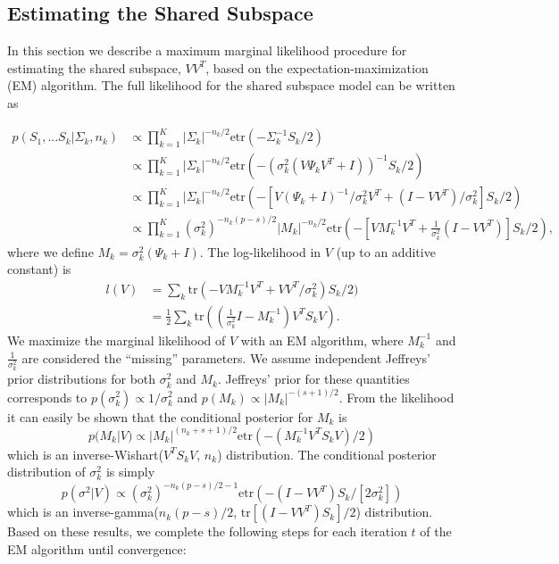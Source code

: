 \documentclass[12pt]{article}
\newcommand{\tr}{\text{tr}}
\newcommand{\etr}{\text{etr}}
\begin{document}

\subsection{Estimating the  Shared Subspace}
\label{sec:em}

In this section we describe a maximum marginal likelihood procedure for
estimating the shared subspace, $VV^T$, based on the
expectation-maximization (EM) algorithm.  The full likelihood
for the shared subspace model can be written as

\begin{align}
\nonumber p(S_1, ... S_k | \Sigma_k,n_k) &\propto \prod_{k=1}^K |\Sigma_k|^{-n_k/2}\etr(-\Sigma_k^{-1}S_k/2)  \\
\nonumber &\propto \prod_{k=1}^K  |\Sigma_k|^{-n_k/2}\etr(-(\sigma_k^2(V\Psi_kV^T +
  I))^{-1}S_k/2) \\
\nonumber &\propto \prod_{k=1}^K  |\Sigma_k|^{-n_k/2}\etr(-\left[V(\Psi_k +
  I)^{-1}/\sigma_k^2 V^T + (I-VV^T)/\sigma^2_k\right]S_k/2)
  \\
&\propto \prod_{k=1}^K  (\sigma_k^2)^{-n_k(p-s)/2}|M_k|^{-n_k/2}\etr(-\left[VM_k^{-1}V^T + \frac{1}{\sigma^2_k} (I-VV^T)\right]S_k/2) ,
\end{align}
%
\noindent where we define $M_k = \sigma_k^2(\Psi_k + I)$.  The log-likelihood in
$V$ (up to an additive constant) is
%
\begin{align}
\nonumber l(V) &= \sum_k \tr\left(-VM_k^{-1}V^T +
       VV^T/\sigma^2_k\right)S_k/2)\\
&=\frac{1}{2}\sum_k \tr\left((\frac{1}{\sigma_k^2}I-M_k^{-1})V^T
  S_kV\right).
\label{eqn:likV}
\end{align}
%
We maximize the marginal likelihood of $V$ with an EM algorithm, where
$M_k^{-1}$ and $\frac{1}{\sigma_k^2}$ are considered the
``missing'' parameters.  We assume independent Jeffreys'
prior distributions for both $\sigma_k^2$ and $M_k$.  Jeffreys' prior
for these quantities corresponds to
$p(\sigma_k^2) \propto 1/\sigma_k^2$ and
$p(M_k) \propto |M_k|^{-(s+1)/2}$.  From the likelihood it can easily
be shown that the conditional posterior for $M_k$ is
%
$$p(M_k | V) \propto |M_k|^{(n_k + s + 1)/2}\etr(-(M_k^{-1}V^TS_kV)/2) $$
%
\noindent which is an inverse-Wishart($V^TS_kV$, $n_k$) distribution.  The
conditional posterior distribution of $\sigma_k^2$ is simply
%
$$p\left(\sigma^2 | V\right) \propto (\sigma_k^2)^{-n_k(p-s)/2-1}\etr\left(- (I-VV^T)S_k/[2\sigma_k^2]\right)  $$
%
\noindent which is an inverse-gamma($n_k(p-s)/2$,
$\text{tr}[(I-VV^T)S_k]/2$) distribution.  Based on these
results, we complete the following steps for each iteration $t$ of
the EM algorithm until convergence:
\end{document}
